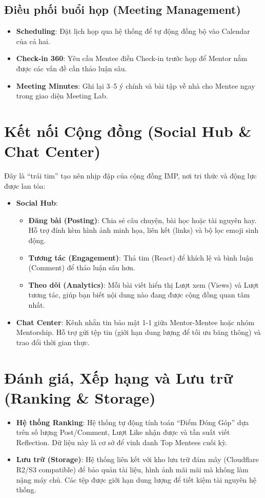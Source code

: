 \subsection{Điều phối buổi họp (Meeting Management)}
\begin{itemize}
    \item \textbf{Scheduling}: Đặt lịch họp qua hệ thống để tự động đồng bộ vào Calendar của cả hai.
    \item \textbf{Check-in 360}: Yêu cầu Mentee điền Check-in trước họp để Mentor nắm được các vấn đề cần thảo luận sâu.
    \item \textbf{Meeting Minutes}: Ghi lại 3--5 ý chính và bài tập về nhà cho Mentee ngay trong giao diện Meeting Lab.
\end{itemize}

\section{Kết nối Cộng đồng (Social Hub \& Chat Center)}
Đây là ``trái tim'' tạo nên nhịp đập của cộng đồng IMP, nơi tri thức và động lực được lan tỏa:

\begin{itemize}
    \item \textbf{Social Hub}: 
        \begin{itemize}
            \item \textbf{Đăng bài (Posting)}: Chia sẻ câu chuyện, bài học hoặc tài nguyên hay. Hỗ trợ đính kèm hình ảnh minh họa, liên kết (links) và bộ lọc emoji sinh động.
            \item \textbf{Tương tác (Engagement)}: Thả tim (React) để khích lệ và bình luận (Comment) để thảo luận sâu hơn.
            \item \textbf{Theo dõi (Analytics)}: Mỗi bài viết hiển thị Lượt xem (Views) và Lượt tương tác, giúp bạn biết nội dung nào đang được cộng đồng quan tâm nhất.
        \end{itemize}
    \item \textbf{Chat Center}: Kênh nhắn tin bảo mật 1-1 giữa Mentor-Mentee hoặc nhóm Mentorship. Hỗ trợ gửi tệp tin (giới hạn dung lượng để tối ưu băng thông) và trao đổi thời gian thực.
\end{itemize}

\section{Đánh giá, Xếp hạng và Lưu trữ (Ranking \& Storage)}
\begin{itemize}
    \item \textbf{Hệ thống Ranking}: Hệ thống tự động tính toán ``Điểm Đóng Góp'' dựa trên số lượng Post/Comment, Lượt Like nhận được và tần suất viết Reflection. Dữ liệu này là cơ sở để vinh danh Top Mentees cuối kỳ.
    \item \textbf{Lưu trữ (Storage)}: Hệ thống liên kết với kho lưu trữ đám mây (Cloudflare R2/S3 compatible) để bảo quản tài liệu, hình ảnh mãi mãi mà không làm nặng máy chủ. Các tệp được giới hạn dung lượng để tiết kiệm tài nguyên hệ thống.
\end{itemize}
